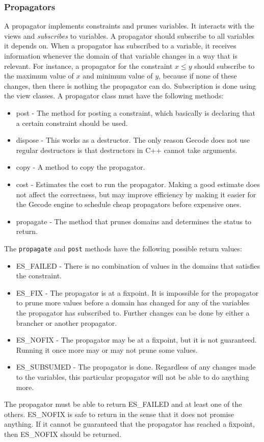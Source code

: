 \documentclass[a4paper,11pt]{article}
\begin{document}
\subsubsection{Propagators}
\label{sec:propagators}
A propagator implements constraints and prunes variables. It interacts with the views and \textit{subscribes} to variables. A propagator should subscribe to all variables it depends on. When a propagator has subscribed to a variable, it receives information whenever the domain of that variable changes in a way that is relevant. For instance, a propagator for the constraint $x\le y$ should subscribe to the maximum value of $x$ and minimum value of $y$, because if none of these changes, then there is nothing the propagator can do. Subscription is done using the view classes. A propagator class must have the following methods:
\begin{itemize}
\item{post} - The method for posting a constraint, which basically is declaring that a certain constraint should be used.
\item{dispose} - This works as a destructor. The only reason Gecode does not use regular destructors is that destructors in C++ cannot take arguments.
\item{copy} - A method to copy the propagator.
\item{cost} - Estimates the cost to run the propagator. Making a good estimate does not affect the correctness, but may improve efficiency by making it easier for the Gecode engine to schedule cheap propagators before expensive ones.
\item{propagate} - The method that prunes domains and determines the status to return.
\end{itemize}
The \texttt{propagate} and \texttt{post} methods have the following possible return values:
\begin{itemize}
\item{ES\_FAILED} - There is no combination of values in the domains that satisfies the constraint. 
\item{ES\_FIX} - The propagator is at a fixpoint. It is impossible for the propagator to prune more values before a domain has changed for any of the variables the propagator has subscribed to. Further changes can be done by either a brancher or another propagator.
\item{ES\_NOFIX} - The propagator may be at a fixpoint, but it is not guaranteed. Running it once more may or may not prune some values. 
\item{ES\_SUBSUMED} - The propagator is done. Regardless of any changes made to the variables, this particular propagator will not be able to do anything more.
\end{itemize}
The propagator must be able to return ES\_FAILED and at least one of the others. ES\_NOFIX is safe to return in the sense that it does not promise anything. If it cannot be guaranteed that the propagator has reached a fixpoint, then ES\_NOFIX should be returned. 
\end{document}
